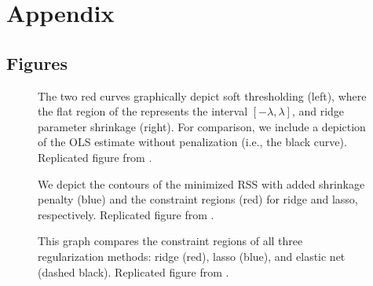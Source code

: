 \section{Appendix}\label{section:appendix}

\subsection{Figures}

\setcounter{subfigure}{0}
\begin{figure}[H]
\centering
\subfloat{\scalebox{0.6}{}}\hspace{1.5cm}
\subfloat{\scalebox{0.6}{}}
\caption[Soft thresholding and ridge shrinkage]{The two red curves graphically depict soft thresholding (left), where the flat region of the represents the interval $[-\lambda, \lambda]$, and ridge parameter shrinkage (right). For comparison, we include a depiction of the OLS estimate without penalization (i.e., the black curve). Replicated figure from \cite{murphy2012machine}.}
\label{fig:soft}
\end{figure}    

\setcounter{subfigure}{0}
\begin{figure}[H]
\centering
{}\hspace{1.5cm}
\caption[RSS contours and constraint regions for ridge and lasso]{We depict the contours of the minimized RSS with added shrinkage penalty (blue) and the constraint regions (red) for ridge and lasso, respectively. Replicated figure from \cite{hastie2008elements}.}
\label{fig:ridgelassoconstraint}
\end{figure}

\begin{figure}[H]
  \centering
    \scalebox{0.8}{}
    \caption[Constraint regions for ridge, lasso, and elastic net]{This graph compares the constraint regions of all three regularization methods: ridge (red), lasso (blue), and elastic net (dashed black). Replicated figure from \cite{zou2005regularization}.}
    \label{fig:plotnorms}
\end{figure}

